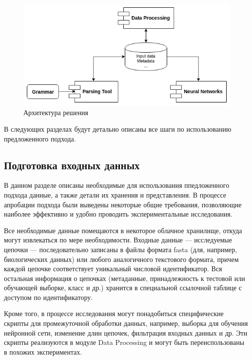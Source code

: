 \documentclass[14pt]{matmex-diploma-custom}
\begin{document}
\begin{figure}[h]
\begin{center}
\centering
\includegraphics[width=15cm]{arch.png}
\caption{Архитектура решения}
\label{arch}
\end{center}
\end{figure}    

В следующих разделах будут детально описаны все шаги по использованию предложенного подхода.

\subsection{Подготовка входных данных}

В данном разделе описаны необходимые для использования ппедложенного подхода данные, а также детали их хранения и представления. В процессе апробации подхода были выведены некоторые общие требования, позволяющие наиболее эффективно и удобно проводить экспериментальные исследования. 

Все необходимые данные помещаются в некоторое облачное хранилище, откуда могут извлекаться по мере необходимости. Входные данные --- исследуемые цепочки --- последовательно записаны в файлы формата fasta (для, например, биологических данных) или любого аналогичного текстового формата, причем каждой цепочке соответствует уникальный числовой идентификатор. Вся остальная информация о цепочках (метаданные, принадлежность к тестовой или обучающей выборке, класс и др.) хранится в специальной ссылочной таблице с доступом по идентификатору. 

Кроме того, в процессе исследования могут понадобиться специфические скрипты для промежуточной обработки данных, например, выборка для обучения нейронной сети, изменение длин цепочек, фильтрация входных данных и др. Эти скрипты реализуются в модуле Data Processing и могут быть переиспользованы в похожих экспериментах.
\end{document}
